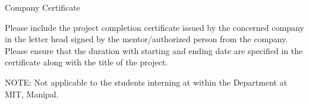 

\begin{center} {\large Company Certificate \par}\end{center}

Please include the project completion certificate issued by the concerned company in the letter head signed by the mentor/authorized person from the company. Please ensure that the duration with starting and ending date are specified in the certificate along with the title of the project.

NOTE: Not applicable to the students interning at within the Department at MIT, Manipal.